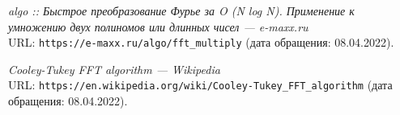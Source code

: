 \begin{thebibliography}{99}

{\itshape algo :: Быстрое преобразование Фурье за O (N log N). Применение к умножению двух полиномов или длинных чисел --- e-maxx.ru} \\URL: \texttt{https://e-maxx.ru/algo/fft\_multiply} (дата обращения: 08.04.2022).

{\itshape Cooley-Tukey FFT algorithm --- Wikipedia} \\URL: \texttt{https://en.wikipedia.org/wiki/Cooley-Tukey\_FFT\_algorithm} (дата обращения: 08.04.2022).

\end{thebibliography}
\pagebreak
